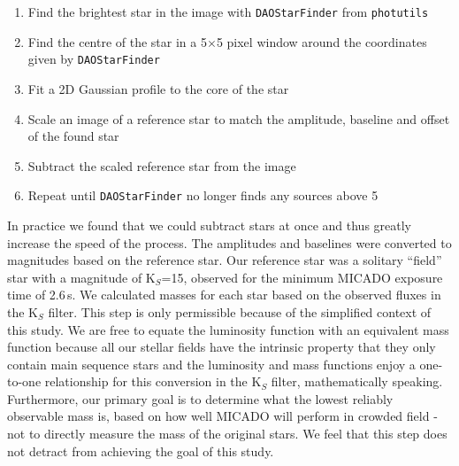 \begin{enumerate}
    \item Find the brightest star in the image with \verb+DAOStarFinder+ from \verb+photutils+ \citep{photutils}
    \item Find the centre of the star in a 5$\times$5 pixel window around the coordinates given by \verb+DAOStarFinder+
    \item Fit a 2D Gaussian profile to the core of the star
    \item Scale an image of a reference star to match the amplitude, baseline and offset of the found star
    \item Subtract the scaled reference star from the image
    \item Repeat until \verb+DAOStarFinder+ no longer finds any sources above 5\,\sig
\end{enumerate}

In practice we found that we could subtract  stars at once and thus greatly increase the speed of the process. The amplitudes and baselines were converted to magnitudes based on the reference star. Our reference star was a solitary ``field'' star with a magnitude of K$_S$=15, observed for the minimum {MICADO} exposure time of 2.6\,s. We calculated masses for each star based on the observed fluxes in the K$_S$ filter. This step is only permissible because of the simplified context of this study. We are free to equate the luminosity function with an equivalent mass function because all our stellar fields have the intrinsic property that they only contain main sequence stars and the luminosity and mass functions enjoy a one-to-one relationship for this conversion in the K$_S$ filter, mathematically speaking. Furthermore, our primary goal is to determine what the lowest reliably observable mass is, based on how well MICADO will perform in crowded field - not to directly measure the mass of the original stars. We feel that this step does not detract from achieving the goal of this study. 


